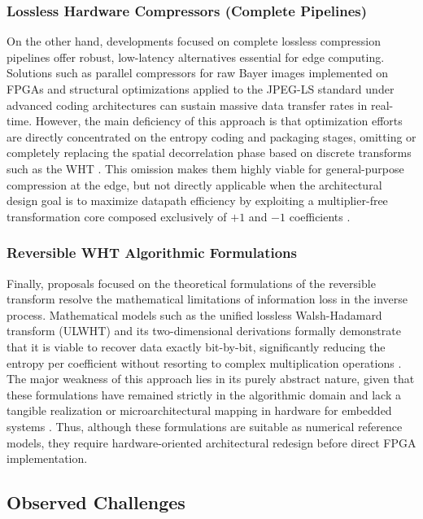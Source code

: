 \documentclass[conference]{IEEEtran}
\begin{document}
\subsubsection{Lossless Hardware Compressors (Complete Pipelines)}
On the other hand, developments focused on complete lossless compression pipelines offer robust, 
low-latency alternatives essential for edge computing. Solutions such as parallel compressors 
for raw Bayer images implemented on FPGAs \cite{regorsek2024} and structural optimizations applied to the JPEG-LS standard under advanced coding architectures \cite{alonso2021} can sustain
massive data transfer rates in real-time. However, the main deficiency of this approach is that 
optimization efforts are directly concentrated on the entropy coding and packaging stages, 
omitting or completely replacing the spatial decorrelation phase based on discrete transforms 
such as the WHT \cite{alonso2021}. This omission makes them highly viable for general-purpose compression at the
edge, but not directly applicable when the architectural design goal is to
maximize datapath efficiency by exploiting a multiplier-free transformation core composed exclusively of $+1$ and $-1$ coefficients
\cite{hafizullah2018}.

\subsubsection{Reversible WHT Algorithmic Formulations}
Finally, proposals focused on the theoretical formulations of the reversible transform resolve the 
mathematical limitations of information loss in the inverse process. Mathematical models such as 
the unified lossless Walsh-Hadamard transform (ULWHT) and its two-dimensional derivations formally 
demonstrate that it is viable to recover data exactly bit-by-bit, significantly reducing the entropy 
per coefficient without resorting to complex multiplication operations \cite{jung1997, komatsu2001}. 
The major weakness of this approach lies in its purely abstract nature, given that these formulations 
have remained strictly in the algorithmic domain and lack a tangible realization or microarchitectural 
mapping in hardware for embedded systems \cite{jung1997}. Thus, although these formulations are suitable as numerical reference models,
they require hardware-oriented architectural redesign before direct FPGA implementation.

\subsection{Observed Challenges}
\end{document}
